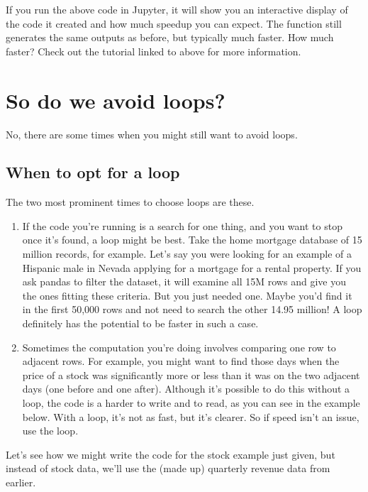 \documentclass[letterpaper,10pt,english]{sphinxmanual}
\begin{document}
If you run the above code in Jupyter, it will show you an interactive display of the code it created and how much speedup you can expect.  The function still generates the same outputs as before, but typically much faster.  How much faster?  Check out the tutorial linked to above for more information.


\section{So do we  avoid loops?}
\label{\detokenize{chapter-11-processing-rows:so-do-we-always-avoid-loops}}
No, there are some times when you might still want to avoid loops.


\subsection{When to opt for a loop}
\label{\detokenize{chapter-11-processing-rows:when-to-opt-for-a-loop}}
The two most prominent times to choose loops are these.
\begin{enumerate}
%
\item {} 
If the code you’re running is a search for one thing, and you want to stop once it’s found, a loop might be best.  Take the home mortgage database of 15 million records, for example.  Let’s say you were looking for an example of a Hispanic male in Nevada applying for a mortgage for a rental property.  If you ask pandas to filter the dataset, it will examine all 15M rows and give you  the ones fitting these criteria.  But you just needed one.  Maybe you’d find it in the first 50,000 rows and not need to search the other 14.95 million!  A loop definitely has the potential to be faster in such a case.

\item {} 
Sometimes the computation you’re doing involves comparing one row to adjacent rows.  For example, you might want to find those days when the price of a stock was significantly more or less than it was on the two adjacent days (one before and one after).  Although it’s possible to do this without a loop, the code is a harder to write and to read, as you can see in the example below.  With a loop, it’s not as fast, but it’s clearer.  So if speed isn’t an issue, use the loop.

\end{enumerate}

Let’s see how we might write the code for the stock example just given, but instead of stock data, we’ll use the (made up) quarterly revenue data from earlier.
\end{document}
